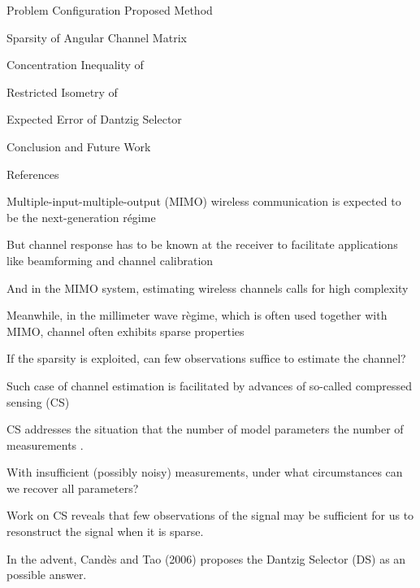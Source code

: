 

\blank [big]

\blank [big]


\page [yes] %

{
\I Problem Configuration Proposed Method

\I Sparsity of Angular Channel Matrix

\I Concentration Inequality of 

\I Restricted Isometry of 

\I Expected Error of Dantzig Selector

\I Conclusion and Future Work

\I References
}

\page [yes] %

{
\I Multiple-input-multiple-output (MIMO) wireless communication is expected to be the next-generation r\'egime

\I But channel response has to be known at the receiver to facilitate applications like beamforming and channel calibration

\I And in the MIMO system, estimating wireless channels calls for high complexity

\I Meanwhile, in the millimeter wave r\`egime, which is often used together with MIMO, channel often exhibits sparse properties

\I If the sparsity is exploited, can few observations suffice to estimate the channel?
}

\page [yes] %

{
\I Such case of channel estimation is facilitated by advances of so-called compressed sensing (CS)

\I CS addresses the situation that the number of model parameters  the number of measurements .

\I With insufficient (possibly noisy) measurements, under what circumstances can we recover all  parameters?

\I Work on CS reveals that few observations of the signal may be sufficient for us to resonstruct the signal when it is sparse.

\I In the advent, Cand\`es and Tao (2006) proposes the Dantzig Selector (DS) as an possible answer.
}

